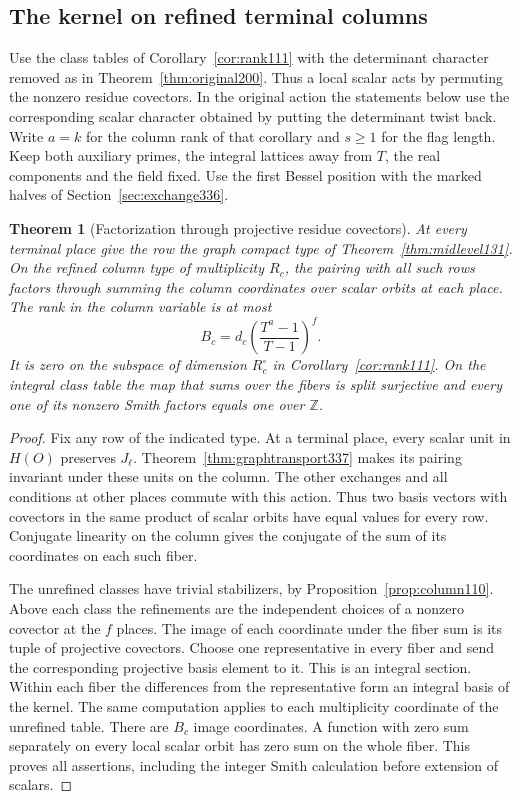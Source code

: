 \documentclass[a4paper,11pt]{article}
\newtheorem{theorem}[proposition]{Theorem}
\theoremstyle{definition}
\theoremstyle{remark}
\numberwithin{equation}{section}
\begin{document}
\subsection{The kernel on refined terminal columns}\label{sec:projectiveperiod337}
Use the class tables of Corollary~\ref{cor:rank111} with the
determinant character removed as in Theorem~\ref{thm:original200}.
Thus a local scalar acts by permuting the nonzero residue covectors.
In the original action the statements below use the corresponding
scalar character obtained by putting the determinant twist back.
Write \(a=k\) for the column rank of that corollary and \(s\ge1\)
for the flag length. Keep both auxiliary primes, the integral
lattices away from \(T\), the real components and the field fixed.
Use the first Bessel position with the marked halves of
Section~\ref{sec:exchange336}.

\begin{theorem}[Factorization through projective residue covectors]\label{thm:projectiveperiod337}
At every terminal place give the row the graph compact type of
Theorem~\ref{thm:midlevel131}. On the refined column type of
multiplicity \(R_c\), the pairing with all such rows factors through
summing the column coordinates over scalar orbits at each place.
The rank in the column variable is at most
\[
             B_c=d_c\left(\frac{T^a-1}{T-1}\right)^f .
\]
It is zero on the subspace of dimension \(R_c^\circ\) in
Corollary~\ref{cor:rank111}. On the integral class table the
map that sums over the fibers is split surjective and every one
of its nonzero Smith factors equals one over \(\mathbb Z\).
\end{theorem}
\begin{proof}
Fix any row of the indicated type. At a terminal place, every
scalar unit in \(H(O)\) preserves \(J_\ell\). Theorem~\ref{thm:graphtransport337}
makes its pairing invariant under these units on the column.
The other exchanges and all conditions at other places commute
with this action. Thus two basis vectors with covectors in the
same product of scalar orbits have equal values for every row.
Conjugate linearity on the column gives the conjugate of the
sum of its coordinates on each such fiber.

The unrefined classes have trivial stabilizers, by
Proposition~\ref{prop:column110}. Above each class the refinements
are the independent choices of a nonzero covector at the \(f\)
places. The image of each coordinate under the fiber sum is its
tuple of projective covectors. Choose one representative in every
fiber and send the corresponding projective basis element to it.
This is an integral section. Within each fiber the differences
from the representative form an integral basis of the kernel.
The same computation applies to each multiplicity coordinate of
the unrefined table. There are \(B_c\) image coordinates. A
function with zero sum separately on every local scalar orbit
has zero sum on the whole fiber. This proves all assertions,
including the integer Smith calculation before extension of scalars.
\end{proof}
\end{document}

